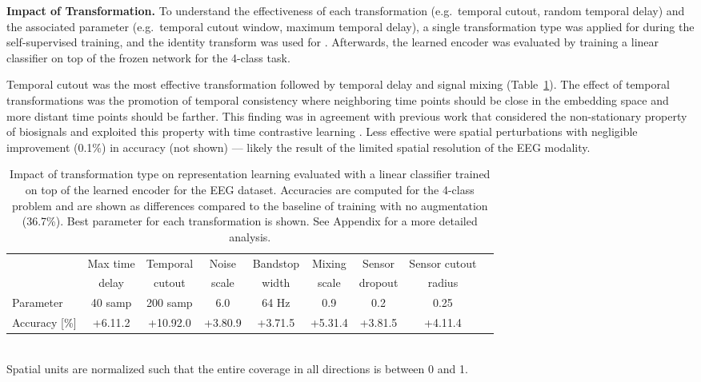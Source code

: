 \documentclass{article}
\newcommand{\std}[1]{{\scriptsize{#1}}}
\renewcommand{\paragraph}[1]{\textbf{#1}\hspace{1em}}
\begin{document}
\paragraph{Impact of Transformation.}
To understand the effectiveness of each transformation (e.g.~temporal cutout,
random temporal delay) and the associated parameter (e.g.~temporal cutout
window, maximum temporal delay), a single transformation type was applied for
 during the self-supervised training, and the identity transform was used
for . Afterwards, the learned encoder  was evaluated by training a
linear classifier on top of the frozen network for the 4-class task.

Temporal cutout was the most effective transformation followed by temporal delay
and signal mixing (Table~\ref{table:eeg:aug:abbrev}). The effect of temporal
transformations was the promotion of temporal consistency where neighboring time
points should be close in the embedding space and more distant time points
should be farther. This finding was in agreement with previous work that
considered the non-stationary property of biosignals and exploited this property
with time contrastive learning \cite{hyvarinen_unsupervised_2016}.
Less effective were spatial perturbations with negligible improvement
(0.1\%) in accuracy (not shown) --- likely the result of the limited
spatial resolution of the EEG modality.



\begin{table}[h] \caption{Impact of transformation type on representation
  learning evaluated with a linear classifier trained on top of the learned
  encoder for the EEG dataset. Accuracies are computed for the 4-class problem
  and are shown as differences compared to the baseline of training with no
  augmentation (36.7\%). Best parameter for each transformation is
  shown. See Appendix for a more detailed analysis.}
  \label{table:eeg:aug:abbrev}
  \centering
  \small
  \begin{tabular}{lcccccccc}
    \toprule
    & Max time & Temporal & Noise & Bandstop & Mixing & Sensor      & Sensor cutout \\
    & delay    & cutout   & scale & width    & scale  & dropout  & radius \\
    \hline
    Parameter
    & 40 samp & 200 samp & 6.0 & 64 Hz & 0.9 & 0.2 & 0.25 \\
    Accuracy [\%]
    & +6.1\std{1.2} & +10.9\std{2.0} & +3.8\std{0.9} & +3.7\std{1.5}
    & +5.3\std{1.4} & +3.8\std{1.5} & +4.1\std{1.4}\\
    \bottomrule
  \end{tabular}\\
  \footnotesize{Spatial units are normalized such that the entire coverage
  in all directions is between 0 and 1.}
\end{table} 
\end{document}
